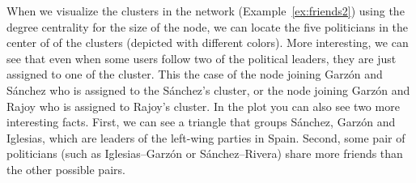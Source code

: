 When we visualize the clusters in the network (Example~\ref{ex:friends2}) using the degree centrality for the size of the node, we can locate the five politicians in the center of of the clusters (depicted with different colors). More interesting, we can see that even when some users follow two of the political leaders, they are just assigned to one of the cluster. This the case of the node joining Garz\'on and S\'anchez who is assigned to the S\'anchez's cluster, or the node joining Garz\'on and Rajoy who is assigned to Rajoy's cluster. In the plot you can also see two more interesting facts. First, we can see a triangle that groups S\'anchez, Garz\'on and Iglesias, which are leaders of the left-wing parties in Spain. Second, some pair of politicians (such as Iglesias--Garz\'on or S\'anchez--Rivera) share more friends than the other possible pairs.

